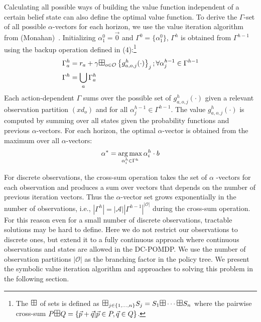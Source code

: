 \documentclass{article}
\def\argmax{\operatornamewithlimits{arg\max}}
\begin{document}
Calculating all possible ways of building the value function independent of a certain belief state can also define the optimal value function. To derive the $\Gamma$-set of all possible $\alpha$-vectors for each horizon, we use the value iteration algorithm from (Monahan)~\cite{monahan82}. 
Initializing  $\alpha^0_1 = \vec{0}$ and $\Gamma^0 = \{ \alpha^0_1 \}$, $\Gamma^h$ is obtained from $\Gamma^{h-1}$ using the backup operation defined in (4):\footnote{The $\textrm{\large $\boxplus$}$ of sets is defined as 
$\textrm{\large $\boxplus$}_{j \in \{ 1,\ldots, n \} } S_j = S_1 \textrm{\large $\boxplus$} \cdots \textrm{\large $\boxplus$} S_n$ where the pairwise cross-sum $P 
\textrm{\large $\boxplus$} Q = \{ \vec{p} + \vec{q} | \vec{p} \in P, \vec{q} \in Q \}$.}
\begin{align}
\Gamma^{h}_a   &= r_a + \gamma \textrm{\large $\boxplus$}_{o \in \mathcal{O}} \left\{ g^h_{a,o,j}(\cdot) \right\}_j ;  \forall \alpha^{h-1}_{j} \in \Gamma^{h-1}  \\
\Gamma^h  &= \bigcup_a \Gamma^h_a 
\end{align}
Each action-dependent $\Gamma$ sums over the possible set of $g^h_{a,o,j}(\cdot)$ given a relevant observation partition $(xd_o)$ and for all $\alpha^{h-1}_{j} \in \Gamma^{h-1} $. The value $g^h_{a,o,j}(\cdot)$ is computed by summing over all states given the probability functions and previous $\alpha$-vectors.  
For each horizon, the optimal $\alpha$-vector is obtained from the maximum over all $\alpha$-vectors: 
\begin{align}
\alpha^* = \argmax_{\alpha^h_i \in \Gamma^h} \alpha^h_i \cdot b \nonumber
\end{align}

For discrete observations, the cross-sum operation takes the set of $\alpha$ -vectors for each observation and produces a sum over vectors that depends on the number of previous iteration vectors. Thus the $\alpha$-vector set grows exponentially in the number of observations, i.e., $|\Gamma^{h}| = |\mathcal{A}|
|\Gamma^{h-1}|^{|\mathcal{O}|}$ during the cross-sum operation. For this reason even for a small number of discrete observations, tractable solutions may be hard to define. Here we do not restrict our observations to discrete ones, but extend it to a fully continuous approach where continuous observations and states are allowed in the DC-POMDP. We use the number of  observation partitions $|\mathcal{O}|$ as the branching factor in the policy tree. We present the symbolic value iteration algorithm and approaches to solving this problem in the following section. 
\end{document}
